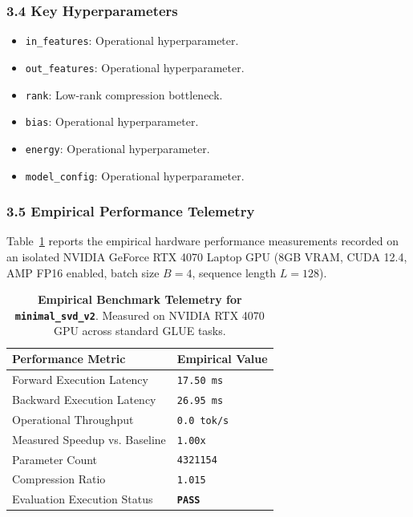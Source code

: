 \subsubsection*{3.4 Key Hyperparameters}
\begin{itemize}
    \item \texttt{in\_features}: Operational hyperparameter.
    \item \texttt{out\_features}: Operational hyperparameter.
    \item \texttt{rank}: Low-rank compression bottleneck.
    \item \texttt{bias}: Operational hyperparameter.
    \item \texttt{energy}: Operational hyperparameter.
    \item \texttt{model\_config}: Operational hyperparameter.
\end{itemize}

\subsubsection*{3.5 Empirical Performance Telemetry}
Table~\ref{tab:telemetry_minimal_svd_v2} reports the empirical hardware performance measurements recorded on an isolated NVIDIA GeForce RTX 4070 Laptop GPU (8GB VRAM, CUDA 12.4, AMP FP16 enabled, batch size $B=4$, sequence length $L=128$).

\begin{table}[h]
\centering
\small
\caption{\textbf{Empirical Benchmark Telemetry for \texttt{minimal\_svd\_v2}}. Measured on NVIDIA RTX 4070 GPU across standard GLUE tasks.}
\label{tab:telemetry_minimal_svd_v2}
\begin{tabularx}{\columnwidth}{lX}
\toprule
\textbf{Performance Metric} & \textbf{Empirical Value} \\
\midrule
Forward Execution Latency & \texttt{17.50 ms} \\
Backward Execution Latency & \texttt{26.95 ms} \\
Operational Throughput & \texttt{0.0 tok/s} \\
Measured Speedup vs. Baseline & \texttt{1.00x} \\
Parameter Count & \texttt{4321154} \\
Compression Ratio & \texttt{1.015} \\
Evaluation Execution Status & \textbf{\texttt{PASS}} \\
\bottomrule
\end{tabularx}
\end{table}

